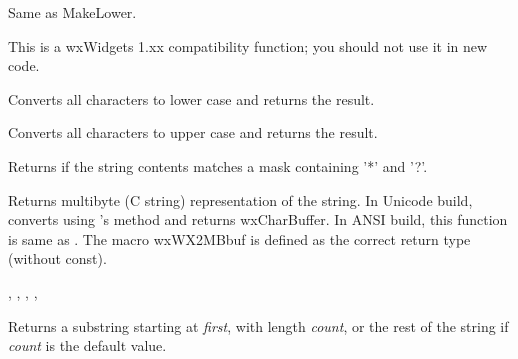\label{wxstringlowercase}


Same as MakeLower.

This is a wxWidgets 1.xx compatibility function; you should not use it in new code.


\label{wxstringmakelower}


Converts all characters to lower case and returns the result.


\label{wxstringmakeupper}


Converts all characters to upper case and returns the result.


\label{wxstringmatches}


Returns \true if the string contents matches a mask containing '*' and '?'.


\label{wxstringmbstr}



Returns multibyte (C string) representation of the string.
In Unicode build, converts using 's 
method and returns wxCharBuffer. In ANSI build, this function is same
as .
The macro wxWX2MBbuf is defined as the correct return type (without const).


,
, ,
, 


\label{wxstringmid}


Returns a substring starting at {\it first}, with length {\it count}, or the rest of
the string if {\it count} is the default value.



